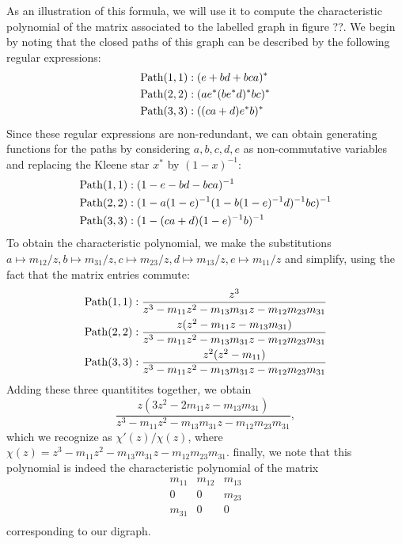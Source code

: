 As an illustration of this formula, we will use it to compute the characteristic
polynomial of the matrix associated to the labelled graph in figure ??.  We begin
by noting that the closed paths of this graph can be described by the following
regular expressions:
\begin{align*}
\mathrm{Path} (1,1) &: (e + bd + bca)^* \\
\mathrm{Path} (2,2) &: (ae^*(be^*d)^*bc)^* \\
\mathrm{Path} (3,3) &: ((ca + d)e^*b)^* \\
\end{align*}
Since these regular expressions are non-redundant, we can obtain generating
functions for the paths by considering $a,b,c,d,e$ as non-commutative
variables and replacing the Kleene star $x^*$ by $(1 - x)^{-1}$:
\begin{align*}
\mathrm{Path} (1,1) &: (1 - e - bd - bca)^{-1} \\
\mathrm{Path} (2,2) &: (1 - a(1-e)^{-1}(1 - b(1-e)^{-1}d)^{-1}bc)^{-1} \\
\mathrm{Path} (3,3) &: (1 - (ca + d)(1 - e)^{-1}b)^{-1} \\
\end{align*}
To obtain the characteristic polynomial, we make the substitutions
$a \mapsto m_{12}/z, b \mapsto m_{31}/z, c \mapsto m_{23}/z, d \mapsto m_{13}/z,
e \mapsto m_{11}/z$ and simplify, using the fact that the matrix entries
commute:
\begin{align*}
\mathrm{Path} (1,1) &: \frac{z^3}
{z^3 - m_{11} z^2 - m_{13} m_{31} z - m_{12} m_{23} m_{31} } \\
\mathrm{Path} (2,2) &: \frac{z(z^2 - m_{11} z - m_{13} m_{31})}
{z^3 - m_{11} z^2 - m_{13} m_{31} z - m_{12} m_{23} m_{31} }  \\
\mathrm{Path} (3,3) &: \frac{z^2(z^2 - m_{11})}
{z^3 - m_{11} z^2 - m_{13} m_{31} z - m_{12} m_{23} m_{31} } \\
\end{align*}
Adding these three quantitites together, we obtain
\[
\frac{z(3 z^2 - 2 m_{11} z - m_{13} m_{31})}
{z^3 - m_{11} z^2 - m_{13} m_{31} z - m_{12} m_{23} m_{31} },
\]
which we recognize as $\chi'(z)/\chi(z)$, where
$\chi(z) = z^3−m_{11} z^2 - m_{13} m_{31} z - m_{12} m_{23} m_{31}$.
finally, we note that this polynomial is indeed the characteristic
polynomial of the matrix
\[
 \begin{matrix}
   m_{11} & m_{12} & m_{13} \\
   0      & 0      & m_{23} \\
   m_{31} & 0      & 0 \\
 \end{matrix}
\]
corresponding to our digraph.

